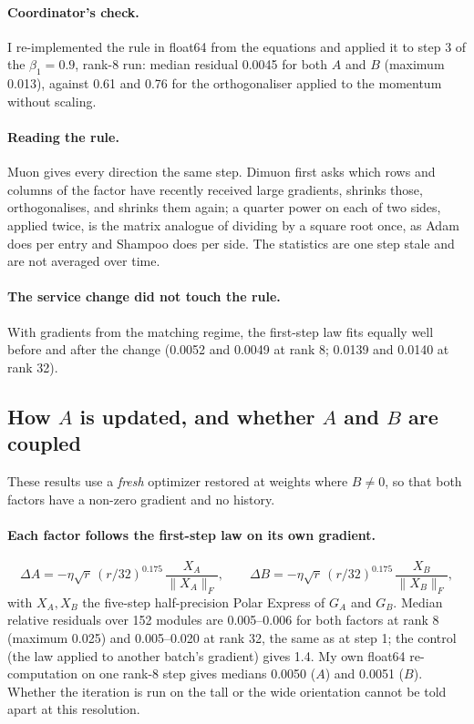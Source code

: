 \documentclass[11pt]{article}
\begin{document}
\paragraph{Coordinator's check.} I re-implemented the rule in float64 from the equations and
applied it to step 3 of the $\beta_1=0.9$, rank-8 run: median residual 0.0045 for both $A$ and
$B$ (maximum 0.013), against 0.61 and 0.76 for the orthogonaliser applied to the momentum
without scaling.

\paragraph{Reading the rule.} Muon gives every direction the same step. Dimuon first asks
which rows and columns of the factor have recently received large gradients, shrinks those,
orthogonalises, and shrinks them again; a quarter power on each of two sides, applied twice,
is the matrix analogue of dividing by a square root once, as Adam does per entry and Shampoo
does per side. The statistics are one step stale and are not averaged over time.

\paragraph{The service change did not touch the rule.} With gradients from the matching
regime, the first-step law fits equally well before and after the change (0.0052 and 0.0049 at
rank 8; 0.0139 and 0.0140 at rank 32).
\subsection{How $A$ is updated, and whether $A$ and $B$ are coupled}\label{sec:fresh}
These results use a \emph{fresh} optimizer restored at weights where $B\neq0$, so that both
factors have a non-zero gradient and no history.

\paragraph{Each factor follows the first-step law on its own gradient.}
\[
\Delta A=-\eta\sqrt r\,(r/32)^{0.175}\,\frac{X_A}{\|X_A\|_F},\qquad
\Delta B=-\eta\sqrt r\,(r/32)^{0.175}\,\frac{X_B}{\|X_B\|_F},
\]
with $X_A,X_B$ the five-step half-precision Polar Express of $G_A$ and $G_B$. Median relative
residuals over 152 modules are 0.005--0.006 for both factors at rank 8 (maximum 0.025) and
0.005--0.020 at rank 32, the same as at step 1; the control (the law applied to another batch's
gradient) gives 1.4. My own float64 re-computation on one rank-8 step gives medians 0.0050
($A$) and 0.0051 ($B$). Whether the iteration is run on the tall or the wide orientation cannot
be told apart at this resolution.
\end{document}
